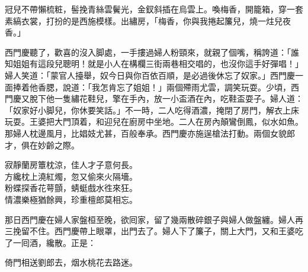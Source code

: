 \begin{myquote} 
冠兒不帶懶梳粧，髻挽青絲雲鬢光，金釵斜插在烏雲上。喚梅香，開籠箱，穿一套素縞衣裳，打扮的是西施模樣。出繡房，「梅香，你與我捲起簾兒，燒一炷兒夜香。」{}
\end{myquote} 

西門慶聽了，歡喜的沒入脚處，一手摟過婦人粉頸來，就親了個嘴，稱誇道：「誰知姐姐有這段兒聰明！就是小人在構欄三街兩巷相交唱的，也沒你這手好彈唱！」婦人笑道：「蒙官人擡舉，奴今日與你百依百順，是必過後休忘了奴家。」西門慶一面捧着他香腮，說道：「我怎肯忘了姐姐！」兩個殢雨尤雲，調笑玩耍。少頃，西門慶又脫下他一隻繡花鞋兒，擎在手內，放一小盃酒在內，吃鞋盃耍子。{}婦人道：「奴家好小脚兒，你休要笑話。」不一時，二人吃得酒濃，掩閉了房門，解衣上床玩耍。王婆把大門頂着，和迎兒在廚房中坐地。二人在房內顛鸞倒鳳，似水如魚。那婦人枕邊風月，比娼妓尤甚，百般奉承。西門慶亦施逞槍法打動。兩個女貌郎才，俱在妙齡之際。

\begin{myquote} 
寂靜蘭房簟枕涼，佳人才子意何長。\\方纔枕上澆紅燭，忽又偷來火隔墻。\\粉蝶探香花萼顫，蜻蜓戲水徃來狂。\\情濃樂極猶餘興，珍重檀郎莫相忘。
\end{myquote} 

那日西門慶在婦人家盤桓至晚，欲囘家，留了幾兩散碎銀子與婦人做盤纏。婦人再三挽留不住。西門慶帶上眼罩，出門去了。婦人下了簾子，關上大門，又和王婆吃了一囘酒，纔散。正是：

\begin{myquote} 
倚門相送劉郎去，烟水桃花去路迷。
\end{myquote} 

